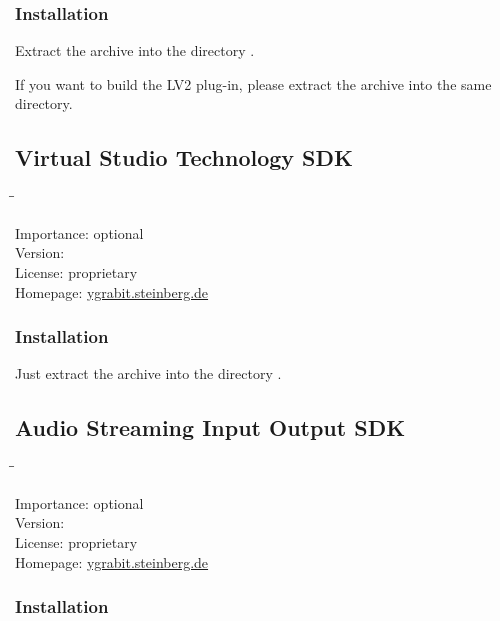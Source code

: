 \subsubsection{Installation}

Extract the archive into the directory .

If you want to build the LV2 plug-in, please extract the archive
 into the same directory.

\subsection{Virtual Studio Technology SDK}

\begin{tabbing}
  \hspace*{6em}\=\=\kill

  Importance:  \> optional \\
  Version:      \\
  License:     \> proprietary \\
  Homepage:    \> \href{http://ygrabit.steinberg.de/}{ygrabit.steinberg.de}
\end{tabbing}

\subsubsection{Installation}

Just extract the archive into the directory
.

\subsection{Audio Streaming Input Output SDK}

\begin{tabbing}
  \hspace*{6em}\=\=\kill

  Importance:  \> optional \\
  Version:      \\
  License:     \> proprietary \\
  Homepage:    \> \href{http://ygrabit.steinberg.de/}{ygrabit.steinberg.de}
\end{tabbing}

\subsubsection{Installation}

